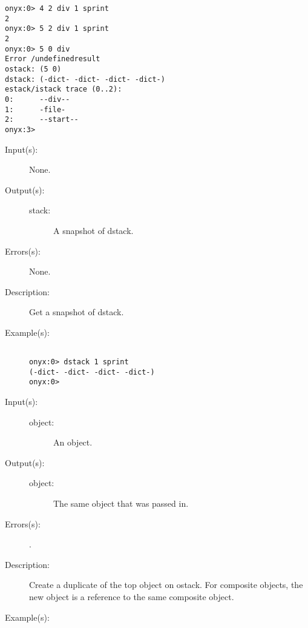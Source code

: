 \begin{description}
\begin{description}
\begin{verbatim}
onyx:0> 4 2 div 1 sprint
2
onyx:0> 5 2 div 1 sprint
2
onyx:0> 5 0 div
Error /undefinedresult
ostack: (5 0)
dstack: (-dict- -dict- -dict- -dict-)
estack/istack trace (0..2):
0:      --div--
1:      -file-
2:      --start--
onyx:3>
		\end{verbatim}
	\end{description}
\label{systemdict:dstack}
\item[{\onyxop{--}{dstack}{stack}}: ]
	\begin{description}\item[]
	\item[Input(s): ] None.
	\item[Output(s): ]
		\begin{description}\item[]
		\item[stack: ]
			A snapshot of dstack.
		\end{description}
	\item[Errors(s): ] None.
	\item[Description: ]
		Get a snapshot of dstack.
	\item[Example(s): ]\begin{verbatim}

onyx:0> dstack 1 sprint
(-dict- -dict- -dict- -dict-)
onyx:0>
		\end{verbatim}
	\end{description}
\label{systemdict:dup}
\item[{\onyxop{object}{dup}{object object}}: ]
	\begin{description}\item[]
	\item[Input(s): ]
		\begin{description}\item[]
		\item[object: ]
			An object.
		\end{description}
	\item[Output(s): ]
		\begin{description}\item[]
		\item[object: ]
			The same object that was passed in.
		\end{description}
	\item[Errors(s): ]
		\begin{description}\item[]
		\item[.]
		\end{description}
	\item[Description: ]
		Create a duplicate of the top object on ostack.  For composite
		objects, the new object is a reference to the same composite
		object.
	\item[Example(s): ]\begin{verbatim}


\end{verbatim}
\end{description}
\end{description}
